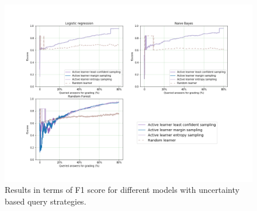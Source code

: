 \begin{figure}[!htb]
	\centering
	\includegraphics[scale=0.46]{images/binary/task3_f1score_uncertainty}
	\caption{Results in terms of F1 score for different models with uncertainty based query strategies.}
	\label{t3_b_uncertainty_f1}
\end{figure}


